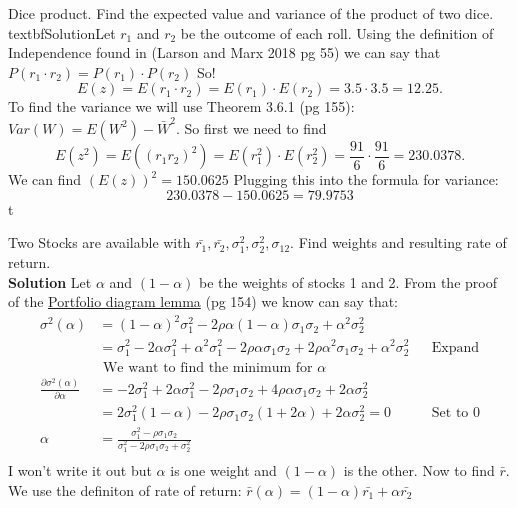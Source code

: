 \documentclass[12pt]{article}
\newenvironment{problem}[3][Problem]{\begin{trivlist}
\item[\hskip \labelsep {\bfseries #1}\hskip \labelsep {\bfseries #2.}]}{\end{trivlist}}
\begin{document}
\begin{problem}2. Dice product. Find the expected value and variance of the product of two dice. \\
textbf{Solution}Let $r_1$ and $r_2$ be the outcome of each roll. Using the definition of Independence found in (Larson and Marx 2018 pg 55) we can say that $P(r_1\cdot r_2) = P(r_1)\cdot P(r_2)$ So! $$E(z) = E(r_1\cdot r_2) = E(r_1)\cdot E(r_2) = 3.5 \cdot 3.5 = 12.25.$$ To find the variance we will use Theorem 3.6.1 (pg 155): $Var(W) = E(W^2)-\bar{W}^2$. So first we need to find $$E(z^2) = E((r_1r_2)^2)=E(r_1^2)\cdot E(r_2^2) = \frac{91}{6}\cdot \frac{91}{6} = 230.0378.$$ We can find $(E(z))^2= 150.0625$ Plugging this into the formula for variance: $$ 230.0378-150.0625 = 79.9753$$t

\end{problem}
\begin{problem}4. Two Stocks are available with $\bar{r_1}, \bar{r_2}, \sigma_1^2 , \sigma_2^2, \sigma_{12}$. Find weights and resulting rate of return.  \\
\textbf{Solution} Let $\alpha $ and $(1-\alpha )$ be the weights of stocks 1 and 2. From the proof of the \underline{Portfolio diagram lemma} (pg 154) we know can say that:
\begin{align*}
\sigma^2(\alpha ) &= (1-\alpha)^2\sigma_1^2 - 2\rho \alpha (1-\alpha)\sigma_1\sigma_2 + \alpha^2\sigma_2^2 \\
&= \sigma_1^2 - 2\alpha \sigma_1^2 + \alpha^2\sigma_1^2 - 2\rho \alpha \sigma_1\sigma_2 + 2\rho \alpha^2 \sigma_1\sigma_2+ \alpha^2\sigma_2^2  &&\text{Expand}\\
&\text{ We want to find the minimum for }\alpha \\ 
\frac{\partial \sigma^2(\alpha )}{\partial \alpha } &= -2\sigma_1^2 + 2\alpha \sigma_1^2 - 2\rho  \sigma_1\sigma_2 + 4\rho \alpha \sigma_1\sigma_2 + 2\alpha \sigma_2^2  \\
&= 2\sigma_1^2(1-\alpha ) - 2\rho \sigma_1\sigma_2(1+2\alpha ) + 2\alpha \sigma_2^2  = 0 && \text{Set to 0} \\
\alpha &= \frac{\sigma_1^2 - \rho \sigma_1 \sigma_2 }{\sigma_1^2 - 2\rho \sigma_1 \sigma_2 + \sigma_2^2} \\
\end{align*}
I won't write it out but $\alpha $ is one weight and $(1-\alpha)$ is the other. Now to find $\bar{r}$. We use the definiton of rate of return: 
$\bar{r}(\alpha ) = (1-\alpha )\bar{r_1} + \alpha \bar{r_2}$
\end{problem}
\end{document}
